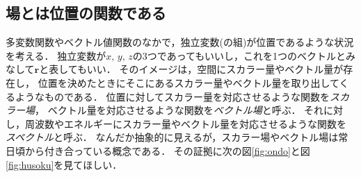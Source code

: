 \subsection{場とは位置の関数である}
多変数関数やベクトル値関数のなかで，独立変数(の組)が位置であるような状況を考える．
独立変数が$x, \, y, \, z$の3つであってもいいし，これを1つのベクトルとみなして$\bm{r}$と表してもいい．
そのイメージは，空間にスカラー量やベクトル量が存在し，
位置を決めたときにそこにあるスカラー量やベクトル量を取り出してくるようなものである．
位置に対してスカラー量を対応させるような関数を\emph{スカラー場}，
ベクトル量を対応させるような関数を\emph{ベクトル場}と呼ぶ．
それに対し，周波数やエネルギーにスカラー量やベクトル量を対応させるような関数を
\emph{スペクトル}と呼ぶ．
なんだか抽象的に見えるが，スカラー場やベクトル場は常日頃から付き合っている概念である．
その証拠に次の図\ref{fig:ondo}と図\ref{fig:husoku}を見てほしい．

